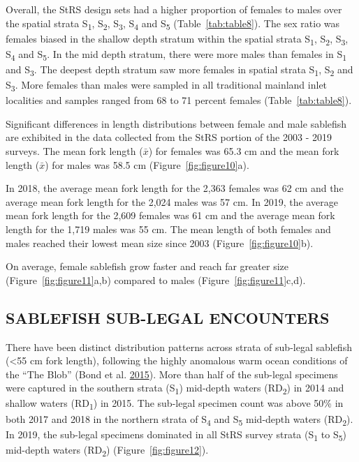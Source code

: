 \documentclass[12pt]{article}\usepackage[]{graphicx}\usepackage[]{color}
\begin{document}
Overall, the StRS design sets had a higher proportion of females to males over the spatial strata S\textsubscript{1}, S\textsubscript{2}, S\textsubscript{3}, S\textsubscript{4} and S\textsubscript{5} (Table~\ref{tab:table8}). The sex ratio was females biased in the shallow depth stratum within the spatial strata S\textsubscript{1}, S\textsubscript{2}, S\textsubscript{3}, S\textsubscript{4} and S\textsubscript{5}. In the mid depth stratum, there were more males than females in S\textsubscript{1} and S\textsubscript{3}. The deepest depth stratum saw more females in spatial strata S\textsubscript{1}, S\textsubscript{2} and S\textsubscript{3}. More females than males were sampled in all traditional mainland inlet localities and samples ranged from 68 to 71 percent females (Table~\ref{tab:table8}).

Significant differences in length distributions between female and male sablefish are exhibited in the data collected from the StRS portion of the 2003 - 2019 surveys. The mean fork length (\(\bar{x}\)) for females was 65.3 cm and the mean fork length (\(\bar{x}\)) for males was 58.5 cm (Figure~\ref{fig:figure10}a).

In 2018, the average mean fork length for the 2,363 females was 62 cm and the average mean fork length for the 2,024 males was 57 cm. In 2019, the average mean fork length for the 2,609 females was 61 cm and the average mean fork length for the 1,719 males was 55 cm. The mean length of both females and males reached their lowest mean size since 2003 (Figure~\ref{fig:figure10}b).

On average, female sablefish grow faster and reach far greater size (Figure~\ref{fig:figure11}a,b) compared to males (Figure~\ref{fig:figure11}c,d).

\hypertarget{sablefish-sub-legal-encounters}{%
\subsection{SABLEFISH SUB-LEGAL ENCOUNTERS}\label{sablefish-sub-legal-encounters}}

There have been distinct distribution patterns across strata of sub-legal sablefish (\textless55 cm fork length), following the highly anomalous warm ocean conditions of the ``The Blob'' (Bond et al. \protect\hyperlink{ref-Bond2015}{2015}). More than half of the sub-legal specimens were captured in the southern strata (S\textsubscript{1}) mid-depth waters (RD\textsubscript{2}) in 2014 and shallow waters (RD\textsubscript{1}) in 2015. The sub-legal specimen count was above 50\% in both 2017 and 2018 in the northern strata of S\textsubscript{4} and S\textsubscript{5} mid-depth waters (RD\textsubscript{2}). In 2019, the sub-legal specimens dominated in all StRS survey strata (S\textsubscript{1} to S\textsubscript{5}) mid-depth waters (RD\textsubscript{2}) (Figure~\ref{fig:figure12}).
\end{document}
